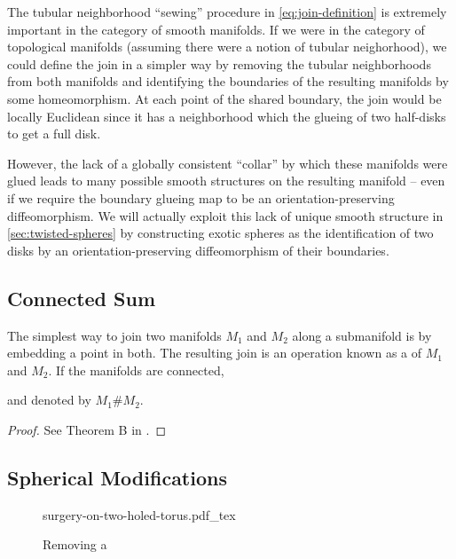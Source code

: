 \begin{remark}
	The tubular neighborhood ``sewing'' procedure in \cref{eq:join-definition} is extremely important in the category of smooth manifolds. If we were in the category of topological manifolds (assuming there were a notion of tubular neighorhood), we could define the join in a simpler way by removing the tubular neighborhoods from both manifolds and identifying the boundaries of the resulting manifolds by some homeomorphism. At each point of the shared boundary, the join would be locally Euclidean since it has a neighborhood which the glueing of two half-disks to get a full disk.

	However, the lack of a globally consistent ``collar'' by which these manifolds were glued leads to many possible smooth structures on the resulting manifold -- even if we require the boundary glueing map to be an orientation-preserving diffeomorphism. We will actually exploit this lack of unique smooth structure in \cref{sec:twisted-spheres} by constructing exotic spheres as the identification of two disks by an orientation-preserving diffeomorphism of their boundaries.
\end{remark}

\subsection{Connected Sum}

The simplest way to join two manifolds $M_1$ and $M_2$ along a submanifold is by embedding a point in both. The resulting join is an operation known as a  of $M_1$ and $M_2$. If the manifolds are connected,

and denoted by $M_1\# M_2$.

\begin{theorem}
\end{theorem}
\begin{proof}
	See Theorem B in \cite{palais1960diffeomorphism}.
\end{proof}


\subsection{Spherical Modifications}

\begin{figure}[ht]
	{surgery-on-two-holed-torus.pdf_tex}
	\caption{Removing a }
\end{figure}

